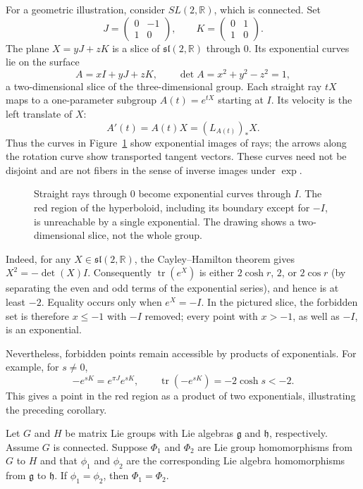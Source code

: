 \documentclass[../main.tex]{subfiles}
\begin{document}
For a geometric illustration, consider $SL(2,\mathbb{R})$, which is connected. Set
\begin{equation*}
  J=\begin{pmatrix}0&-1\\1&0\end{pmatrix},\qquad
  K=\begin{pmatrix}0&1\\1&0\end{pmatrix}.
\end{equation*}
The plane $X=yJ+zK$ is a slice of $\mathfrak{sl}(2,\mathbb{R})$ through $0$. Its exponential curves lie on the surface
\begin{equation*}
  A=xI+yJ+zK,\qquad \det A=x^2+y^2-z^2=1,
\end{equation*}
a two-dimensional slice of the three-dimensional group. Each straight ray $tX$ maps to a one-parameter subgroup $A(t)=e^{tX}$ starting at $I$. Its velocity is the left translate of $X$:
\begin{equation*}
  A'(t)=A(t)X=(L_{A(t)})_*X.
\end{equation*}
Thus the curves in Figure~\ref{fig:sl2-exponential-fibers} show exponential images of rays; the arrows along the rotation curve show transported tangent vectors. These curves need not be disjoint and are not fibers in the sense of inverse images under $\exp$.

\begin{figure}[ht]
    \centering
    \caption{Straight rays through $0$ become exponential curves through $I$. The red region of the hyperboloid, including its boundary except for $-I$, is unreachable by a single exponential. The drawing shows a two-dimensional slice, not the whole group.}
    \label{fig:sl2-exponential-fibers}
\end{figure}

Indeed, for any $X\in\mathfrak{sl}(2,\mathbb{R})$, the Cayley--Hamilton theorem gives $X^2=-\det(X)I$. Consequently $\operatorname{tr}(e^X)$ is either $2\cosh r$, $2$, or $2\cos r$ (by separating the even and odd terms of the exponential series), and hence is at least $-2$. Equality occurs only when $e^X=-I$. In the pictured slice, the forbidden set is therefore $x\leq-1$ with $-I$ removed; every point with $x>-1$, as well as $-I$, is an exponential.

Nevertheless, forbidden points remain accessible by products of exponentials. For example, for $s\neq0$,
\begin{equation*}
  -e^{sK}=e^{\pi J}e^{sK},\qquad \operatorname{tr}(-e^{sK})=-2\cosh s<-2.
\end{equation*}
This gives a point in the red region as a product of two exponentials, illustrating the preceding corollary.

\begin{corollary}{}{}
  Let $G$ and $H$ be matrix Lie groups with Lie algebras $\mathfrak{g}$ and $\mathfrak{h}$, respectively. Assume $G$ is connected. Suppose $\Phi_1$ and $\Phi_2$ are Lie group homomorphisms from $G$ to $H$ and that $\phi_1$ and $\phi_2$ are the corresponding Lie algebra homomorphisms from $\mathfrak{g}$ to $\mathfrak{h}$. If $\phi_1=\phi_2$, then $\Phi_1=\Phi_2$.
\end{corollary}
\end{document}
